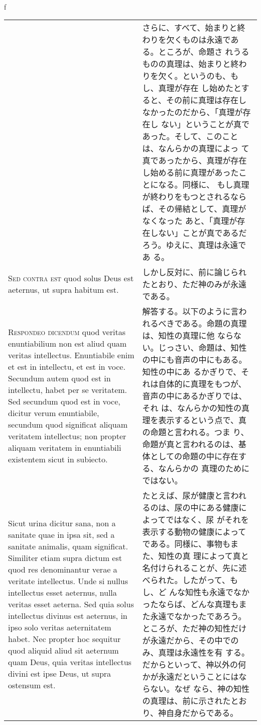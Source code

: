 \\f\documentclass[10pt]{jsarticle} %
\begin{document}
\begin{longtable}{p{21em}p{21em}}
&

さらに、すべて、始まりと終わりを欠くものは永遠である。ところが、命題さ
れうるものの真理は、始まりと終わりを欠く。というのも、もし、真理が存在
し始めたとすると、その前に真理は存在しなかったのだから、「真理が存在し
ない」ということが真であった。そして、このことは、なんらかの真理によっ
て真であったから、真理が存在し始める前に真理があったことになる。同様に、
もし真理が終わりをもつとされるならば、その帰結として、真理がなくなった
あと、「真理が存在しない」ことが真であるだろう。ゆえに、真理は永遠であ
る。

\\

{\scshape Sed contra est} quod solus Deus est aeternus, ut supra
 habitum est.

&

しかし反対に、前に論じられたとおり、ただ神のみが永遠である。

\\

{\scshape Respondeo dicendum} quod veritas enuntiabilium non est aliud
quam veritas intellectus. Enuntiabile enim et est in intellectu, et
est in voce. Secundum autem quod est in intellectu, habet per se
veritatem. Sed secundum quod est in voce, dicitur verum enuntiabile,
secundum quod significat aliquam veritatem intellectus; non propter
aliquam veritatem in enuntiabili existentem sicut in subiecto.


&

解答する。以下のように言われるべきである。命題の真理は、知性の真理に他
ならない。じっさい、命題は、知性の中にも音声の中にもある。知性の中にあ
るかぎりで、それは自体的に真理をもつが、音声の中にあるかぎりでは、それ
は、なんらかの知性の真理を表示するという点で、真の命題と言われる。つま
り、命題が真と言われるのは、基体としての命題の中に存在する、なんらかの
真理のためにではない。

\\

Sicut urina dicitur sana, non a sanitate quae in ipsa sit, sed a
sanitate animalis, quam significat. Similiter etiam supra dictum est
quod res denominantur verae a veritate intellectus. Unde si nullus
intellectus esset aeternus, nulla veritas esset aeterna. Sed quia
solus intellectus divinus est aeternus, in ipso solo veritas
aeternitatem habet. Nec propter hoc sequitur quod aliquid aliud sit
aeternum quam Deus, quia veritas intellectus divini est ipse Deus, ut
supra ostensum est.

&

たとえば、尿が健康と言われるのは、尿の中にある健康によってではなく、尿
がそれを表示する動物の健康によってである。同様に、事物もまた、知性の真
理によって真と名付けられることが、先に述べられた。したがって、もし、ど
んな知性も永遠でなかったならば、どんな真理もまた永遠でなかったであろう。
ところが、ただ神の知性だけが永遠だから、その中でのみ、真理は永遠性を有
する。だからといって、神以外の何かが永遠だということにはならない。なぜ
なら、神の知性の真理は、前に示されたとおり、神自身だからである。


\end{longtable}
\end{document}
